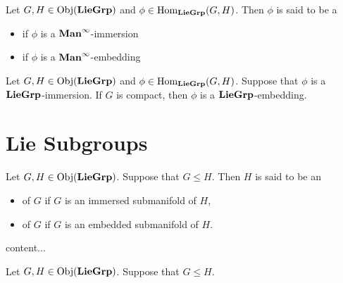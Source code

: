 \documentclass{book}
\begin{document}
\begin{defn}
	Let $G, H \in \operatorname{Obj}(\operatorname*{\text{\textbf{LieGrp}}})$ and $\phi \in \operatorname{Hom}_{\operatorname*{\text{\textbf{LieGrp}}}}(G, H)$. Then $\phi$ is said to be a 
	\begin{itemize}
		\item {} if $\phi$ is a $\operatorname*{\text{\textbf{Man}}^{\infty}}$-immersion  
		\item {} if $\phi$ is a $\operatorname*{\text{\textbf{Man}}^{\infty}}$-embedding  
	\end{itemize}
\end{defn}

\begin{ex}
	Let $G, H \in \operatorname{Obj}(\operatorname*{\text{\textbf{LieGrp}}})$ and $\phi \in \operatorname{Hom}_{\operatorname*{\text{\textbf{LieGrp}}}}(G, H)$. Suppose that $\phi$ is a $\operatorname*{\text{\textbf{LieGrp}}}$-immersion. If $G$ is compact, then $\phi$ is a $\operatorname*{\text{\textbf{LieGrp}}}$-embedding.
\end{ex}
































\newpage
\section{Lie Subgroups}

\begin{defn}
	Let $G, H \in \operatorname{Obj}(\operatorname*{\text{\textbf{LieGrp}}})$. Suppose that $G \leqslant H$. Then $H$ is said to be an
	\begin{itemize}
		\item {} of $G$ if $G$ is an immersed submanifold of $H$,
		\item {} of $G$ if $G$ is an embedded submanifold of $H$.
	\end{itemize}
\end{defn}

\begin{defn}
	content...
\end{defn}


\begin{ex}
	Let $G, H \in \operatorname{Obj}(\operatorname*{\text{\textbf{LieGrp}}})$. Suppose that $G \leqslant H$. 
\end{ex}
\end{document}

